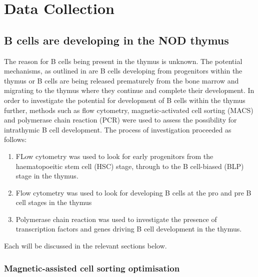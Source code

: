
\chapter{Data Collection}




\section{B cells are developing in the NOD thymus}
The reason for B cells being present in the thymus is unknown. 
The potential mechanisms, as outlined in  are B cells developing from progenitors within the thymus or B cells are being released prematurely from the bone marrow and migrating to the thymus where they continue and complete their development.
In order to investigate the potential for development of B cells within the thymus further, methods such as flow cytometry, magnetic-activated cell sorting (MACS) and polymerase chain reaction (PCR) were used to assess the possibility for intrathymic B cell development.
The process of investigation proceeded as follows:
\begin{enumerate}
\item FLow cytometry was used to look for early progenitors from the haematopoeitic stem cell (HSC) stage, through to the B cell-biased (BLP) stage in the thymus. 
\item Flow cytometry was used to look for developing B cells at the pro and pre B cell stages in the thymus 
\item Polymerase chain reaction was used to investigate the presence of transcription factors and genes driving B cell development in the  thymus. 
\end{enumerate}

Each will be discussed in the relevant sections below.


\subsection{Magnetic-assisted cell sorting optimisation}

